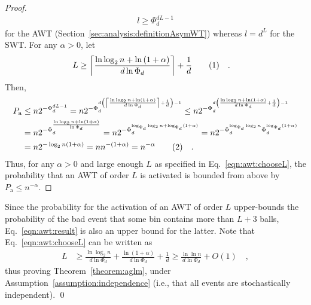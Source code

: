 \documentclass[a4paper,12pt]{article}
\newcommand\numberthis{\addtocounter{equation}{1}\tag{\theequation}}
\newcommand\neqn[1]{\numberthis\label{eqn:#1}}
\begin{document}
\begin{proof}
\begin{align*}
l \geq \Phi_d^{d L -1}
\end{align*}
for the AWT (Section~\ref{sec:analysis:definitionAsymWT}) whereas $l = d^L$ for the SWT.
For any $\alpha > 0$, let 
\begin{align*}
L &\geq \left\lceil{\frac{\ln\log_2 n + \ln\left(1+\alpha\right)}{d \ln \Phi_d}}\right\rceil+\frac{1}{d} \neqn{awt:chooseL}\quad .
\end{align*}
Then, 
\begin{align*}
P_\mathrm{a} &\leq n  2^{-\Phi_d^{d L -1}} 
        = n  2^{-\Phi_d^{d \left(\left\lceil{\frac{\ln\log_2 n + \ln\left(1+\alpha\right)}{d \ln \Phi_d}}\right\rceil+\frac{1}{d}\right) -1}} 
        \leq n  2^{-\Phi_d^{d \left({\frac{\ln\log_2 n + \ln\left(1+\alpha\right)}{d \ln \Phi_d}}+\frac{1}{d}\right) -1}} \\
        &= n  2^{-\Phi_d^{{\frac{\ln\log_2 n + \ln\left(1+\alpha\right)}{\ln \Phi_d}}}} 
        = n  2^{-\Phi_d^{\log_{\Phi_d}\log_2 n + \log_{\Phi_d}\left(1+\alpha\right)}} 
        = n  2^{-\Phi_d^{\log_{\Phi_d}\log_2 n} \Phi_d^{ \log_{\Phi_d}\left(1+\alpha\right)}} \\
         &= n  2^{-\log_2 n \left(1+\alpha\right)} 
         = n  n ^{-(1+\alpha)} = n^{-\alpha} \neqn{awt:result} \quad .
\end{align*}
Thus, for any $\alpha>0$ and large enough $L$ as specified in Eq.~\ref{eqn:awt:chooseL}, the probability that an AWT of order $L$ is activated is bounded from above by $P_\mathrm{a}\leq n^{-\alpha}$.
\end{proof}
Since the probability for the activation of an AWT of order $L$ upper-bounds the probability of the bad event that some bin contains more than $L+3$ balls, Eq.~\ref{eqn:awt:result} is also an upper bound for the latter. Note that Eq.~\ref{eqn:awt:chooseL} can be written as
\begin{align*}
L &\geq \frac{\ln\log_2 n}{d \ln \Phi_d} + \frac{\ln\left(1+\alpha\right)}{d \ln \Phi_d} + \frac{1}{d}
  \geq \frac{\ln\ln n}{d \ln \Phi_d} + O\left(1\right)\quad ,
\end{align*}
thus proving Theorem~\ref{theorem:aglm}, under Assumption~\ref{assumption:independence} (i.e., that all events are stochastically independent). \qed
\end{document}
